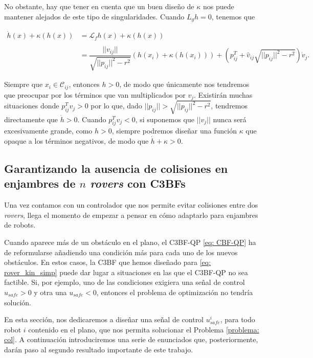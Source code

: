 No obstante, hay que tener en cuenta que un buen diseño de $\kappa$ nos puede mantener alejados de este tipo de singularidades. Cuando $L_g h = 0$, tenemos que

$$
    \begin{array}{rl}
        \dot h(x) + \kappa(h(x)) & = \mathcal{L}_f h(x) + \kappa(h(x)) \\ \\
        & = \dfrac{||v_{ij}||}{\sqrt{||p_{ij}||^2 - r^2}}(h(x_i) + \kappa(h(x_i))) + \left( p_{ij}^T + \hat v_{ij} \sqrt{||p_{ij}||^2 - r^2}\right) \dot v_j.
    \end{array}
$$

Siempre que $x_i \in \mathcal{C}_{ij}$, entonces $h > 0$, de modo que únicamente nos tendremos que preocupar por los términos que van multiplicados por $v_j$. Existirán muchas situaciones donde $p_{ij}^T v_j > 0$ por lo que, dado $||p_{ij}|| > \sqrt{||p_{ij}||^2 - r^2}$, tendremos directamente que $\dot h > 0$. Cuando $p_{ij}^T v_j < 0$, si suponemos que $||v_j||$ nunca será excesivamente grande, como $h >  0$, siempre podremos diseñar una función $\kappa$ que opaque a los términos negativos, de modo que $\dot h + \kappa > 0$.

\vspace{0.2cm}

\subsection{Garantizando la ausencia de colisiones en enjambres de $n$ \textit{rovers} con C3BFs}

Una vez contamos con un controlador que nos permite evitar colisiones entre dos \textit{rovers}, llega el momento de empezar a pensar en cómo adaptarlo para enjambres de robots. 

Cuando aparece más de un obstáculo en el plano, el C3BF-QP \eqref{eq: CBF-QP} ha de reformularse añadiendo una condición más para cada uno de los nuevos obstáculos. En estos casos, la C3BF que hemos diseñado para \eqref{eq: rover_kin_simp} puede dar lugar a situaciones en las que el C3BF-QP no sea factible. Si, por ejemplo, uno de las condiciones exigiera una señal de control $u_{safe}>0$ y otra una $u_{safe}<0$, entonces el problema de optimización no tendría solución.

En esta sección, nos dedicaremos a diseñar una señal de control $u_{safe}^i$, para todo robot $i$ contenido en el plano, que nos permita solucionar el Problema \ref{problema: col}. A continuación introduciremos una serie de enunciados que, posteriormente, darán paso al segundo resultado importante de este trabajo.

